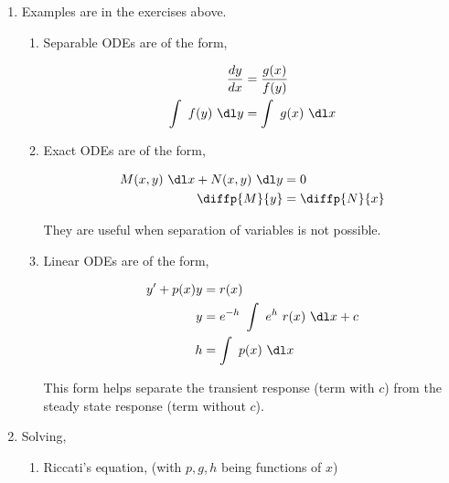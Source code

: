 \begin{enumerate}
    \item Examples are in the exercises above.
          \begin{enumerate}
              \item Separable ODEs are of the form,

                    \begin{align}
                        \frac{dy}{dx}     & = \frac{g(x)}{f(y)} \\
                        \int\ f(y)\ \dl y & = \int\ g(x)\ \dl x
                    \end{align}

              \item Exact ODEs are of the form,

                    \begin{align}
                        M(x, y)\ \dl x + N(x, y)\ \dl y & = 0            \\
                        \diffp{M}{y}                    & = \diffp{N}{x}
                    \end{align}

                    They are useful when separation of variables is not possible.
              \item Linear ODEs are of the form,

                    \begin{align}
                        y' + p(x)y & = r(x)                                 \\
                        y          & = e^{-h}\ \int\ e^{h}\ r(x)\ \dl x + c \\
                        h          & = \int\ p(x)\ \dl x
                    \end{align}

                    This form helps separate the transient response (term with $ c $)
                    from the steady state response (term without $ c $).
          \end{enumerate}

    \item Solving,
          \begin{enumerate}
              \item Riccati's equation, (with $ p, g, h $ being functions of $ x $)


\end{enumerate}
\end{enumerate}
